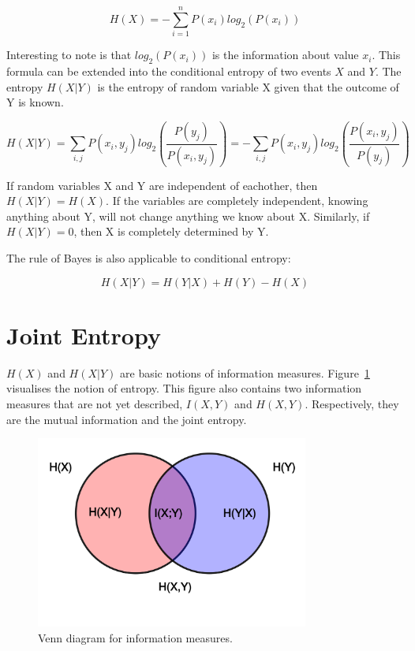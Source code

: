 \begin{equation}
H(X) = -\sum_{i=1}^{n}P(x_i)log_2(P(x_i))
\end{equation}

Interesting to note is that $log_2(P(x_i))$ is the information about value $x_i$. This formula can be extended into the conditional entropy of two events $X$ and $Y$. The entropy $H(X|Y)$ is the entropy of random variable X given that the outcome of Y is known.

\begin{equation}
H(X|Y) = \sum_{i,j}P(x_i, y_j)log_2(\frac{P(y_j)}{P(x_i, y_j)}) = -\sum_{i,j}P(x_i, y_j)log_2(\frac{P(x_i, y_j)}{P(y_j)})
\end{equation}

If random variables X and Y are independent of eachother, then $H(X|Y) = H(X)$. If the variables are completely independent, knowing anything about Y, will not change anything we know about X. Similarly, if $H(X|Y) = 0$, then X is completely determined by Y. 

The rule of Bayes is also applicable to conditional entropy:

\begin{equation}
H(X|Y) = H(Y|X) + H(Y) - H(X)
\end{equation}

\section{Joint Entropy}

$H(X)$ and $H(X|Y)$ are basic notions of information measures. Figure~\ref{entropy} visualises the notion of entropy. This figure also contains two information measures that are not yet described, $I(X,Y)$ and $H(X,Y)$. Respectively, they are the mutual information and the joint entropy.

\begin{figure}[!htb]
\caption{Venn diagram for information measures.}
\label{entropy}
    \centering
    \includegraphics[width=0.8\textwidth]{fig/entropy}
\end{figure}

